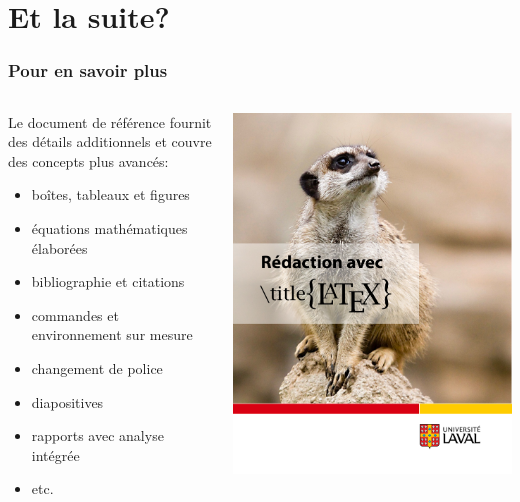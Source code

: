 \section{Et la suite?}

\begin{frame}
  \frametitle{Pour en savoir plus}

  \begin{columns}
    \begin{column}{.6\textwidth}
      Le document de référence fournit des détails additionnels et
      couvre des concepts plus avancés:
      \begin{itemize}
        \small
      \item boîtes, tableaux et figures
      \item équations mathématiques élaborées
      \item bibliographie et citations
      \item commandes et environnement sur mesure
      \item changement de police
      \item diapositives
      \item rapports avec analyse intégrée
      \item etc.
      \end{itemize}
    \end{column}
    \begin{column}{.4\textwidth}
      \includegraphics[height=0.8\textheight,frame]{formation-latex-ul}
    \end{column}
  \end{columns}
\end{frame}

